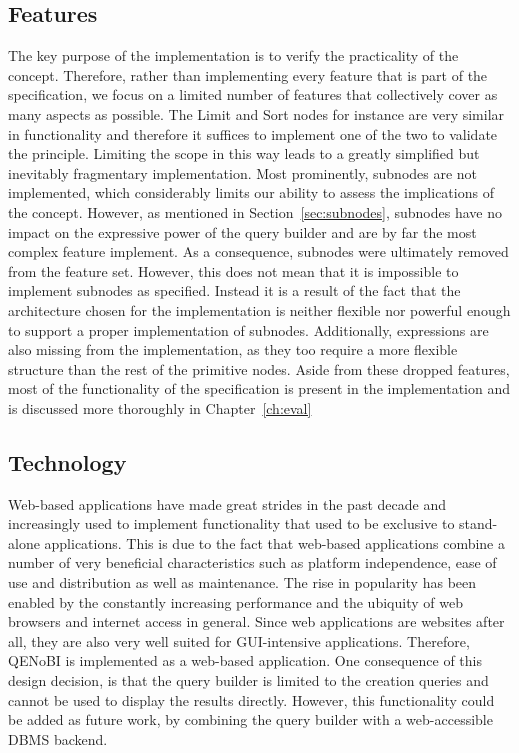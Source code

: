 \documentclass[11pt,a4paper]{globis-book}
\begin{document}
\subsection{Features}
The key purpose of the implementation is to verify the practicality of the concept. Therefore, rather than implementing every feature that is part of the specification, we focus on a limited number of features that collectively cover as many aspects as possible. The Limit and Sort nodes for instance are very similar in functionality and therefore it suffices to implement one of the two to validate the principle. Limiting the scope in this way leads to a greatly simplified but inevitably fragmentary implementation. Most prominently, subnodes are not implemented, which considerably limits our ability to assess the implications of the concept. However, as mentioned in Section~\ref{sec:subnodes}, subnodes have no impact on the expressive power of the query builder and are by far the most complex feature implement. As a consequence, subnodes were ultimately removed from the feature set. However, this does not mean that it is impossible to implement subnodes as specified. Instead it is a result of the fact that the architecture chosen for the implementation is neither flexible nor powerful enough to support a proper implementation of subnodes. Additionally, expressions are also missing from the implementation, as they too require a more flexible structure than the rest of the primitive nodes. Aside from these dropped features, most of the functionality of the specification is present in the implementation and is discussed more thoroughly in Chapter~\ref{ch:eval}

\subsection{Technology}
Web-based applications have made great strides in the past decade and increasingly used to implement functionality that used to be exclusive to stand-alone applications. This is due to the fact that web-based applications combine a number of very beneficial characteristics such as platform independence, ease of use and distribution as well as maintenance. The rise in popularity has been enabled by the constantly increasing performance and the ubiquity of web browsers and internet access in general. Since web applications are websites after all, they are also very well suited for GUI-intensive applications. Therefore, QENoBI is implemented as a web-based application. One consequence of this design decision, is that the query builder is limited to the creation queries and cannot be used to display the results directly. However, this functionality could be added as future work, by combining the query builder with a web-accessible DBMS backend.
\end{document}
